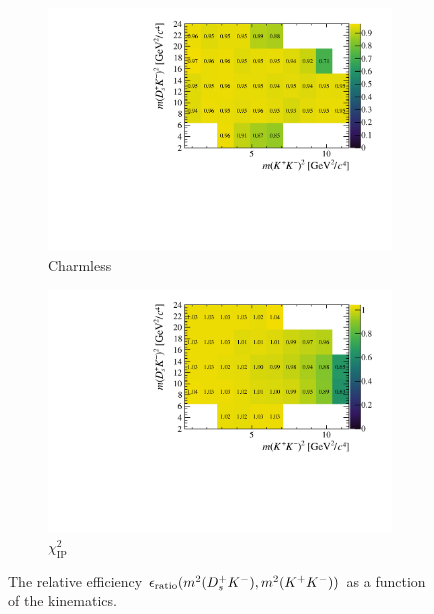 \begin{figure}[!h]
   \centering
   \begin{subfigure}[t]{0.4\textwidth}
      \includegraphics[width=1.0\textwidth]{figs/B2DsKK/Relative_Eff_FDCHI2_All.pdf}
      \caption{Charmless}
      \label{fig:B2DsKK_releff_charmless}
   \end{subfigure}
   \begin{subfigure}[t]{0.4\textwidth}
      \includegraphics[width=1.0\textwidth]{figs/B2DsKK/Relative_Eff_Bcut_All.pdf}
      \caption{$\chi^{2}_{\text{IP}}$}
      \label{fig:B2DsKK_releff_ipchi2}
   \end{subfigure}
   \caption{The relative efficiency $\epsilon_{\text{ratio}}(m^{2}({{D}^+_{s}}{{K}^-}),m^{2}({{K}^+}{{K}^-}))$ as a function of the \decay{\Bp}{\Dsp\Kp\Km} kinematics.}
   \label{fig:B2DsKK_dalitz_eff_two}
\end{figure}

